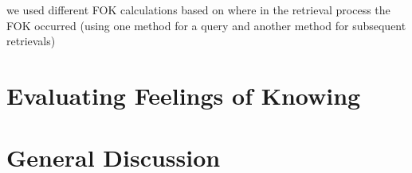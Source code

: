 \documentclass[10pt,letterpaper]{article}
\begin{document}
we used different FOK calculations based on where in the retrieval process the FOK occurred (using one method for a query and another method for subsequent retrievals)

\section{Evaluating Feelings of Knowing}


\section{General Discussion}


%



\setlength{\bibleftmargin}{.125in}
\setlength{\bibindent}{-\bibleftmargin}


\end{document}
